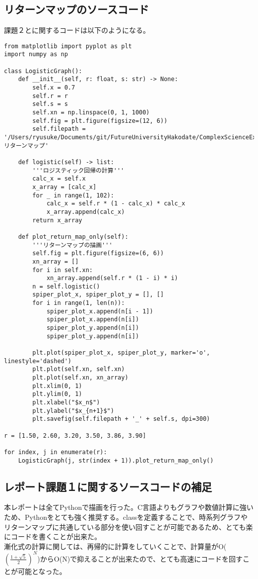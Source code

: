 \documentclass[dvipdfmx,uplatex]{jsarticle}
\begin{document}
\newpage

\subsection{リターンマップのソースコード}

課題２とに関するコードは以下のようになる。

\begin{lstlisting}[caption=Pythonによるリターンマップの描画]
from matplotlib import pyplot as plt
import numpy as np

class LogisticGraph():
    def __init__(self, r: float, s: str) -> None:
        self.x = 0.7
        self.r = r
        self.s = s
        self.xn = np.linspace(0, 1, 1000)
        self.fig = plt.figure(figsize=(12, 6))
        self.filepath = '/Users/ryusuke/Documents/git/FutureUniversityHakodate/ComplexScienceExercise/result/week01_リターンマップ'

    def logistic(self) -> list:
        '''ロジスティック回帰の計算'''
        calc_x = self.x
        x_array = [calc_x]
        for _ in range(1, 102):
            calc_x = self.r * (1 - calc_x) * calc_x
            x_array.append(calc_x)
        return x_array

    def plot_return_map_only(self):
        '''リターンマップの描画'''
        self.fig = plt.figure(figsize=(6, 6))
        xn_array = []
        for i in self.xn:
            xn_array.append(self.r * (1 - i) * i)
        n = self.logistic()
        spiper_plot_x, spiper_plot_y = [], []
        for i in range(1, len(n)):
            spiper_plot_x.append(n[i - 1])
            spiper_plot_x.append(n[i])
            spiper_plot_y.append(n[i])
            spiper_plot_y.append(n[i])

        plt.plot(spiper_plot_x, spiper_plot_y, marker='o', linestyle='dashed')
        plt.plot(self.xn, self.xn)
        plt.plot(self.xn, xn_array)
        plt.xlim(0, 1)
        plt.ylim(0, 1)
        plt.xlabel("$x_n$")
        plt.ylabel("$x_{n+1}$")
        plt.savefig(self.filepath + '_' + self.s, dpi=300)

r = [1.50, 2.60, 3.20, 3.50, 3.86, 3.90]

for index, j in enumerate(r):
    LogisticGraph(j, str(index + 1)).plot_return_map_only()
\end{lstlisting}

\newpage

\subsection{レポート課題１に関するソースコードの補足}
本レポートは全てPythonで描画を行った。C言語よりもグラフや数値計算に強いため、Pythonをとても強く推奨する。classを定義することで、時系列グラフやリターンマップに共通している部分を使い回すことが可能であるため、とても楽にコードを書くことが出来た。\\
漸化式の計算に関しては、再帰的に計算をしていくことで、計算量がO($\displaystyle ({\frac{1 + \sqrt{5}}{2}})^N$)からO(N)で抑えることが出来たので、とても高速にコードを回すことが可能となった。
\end{document}
